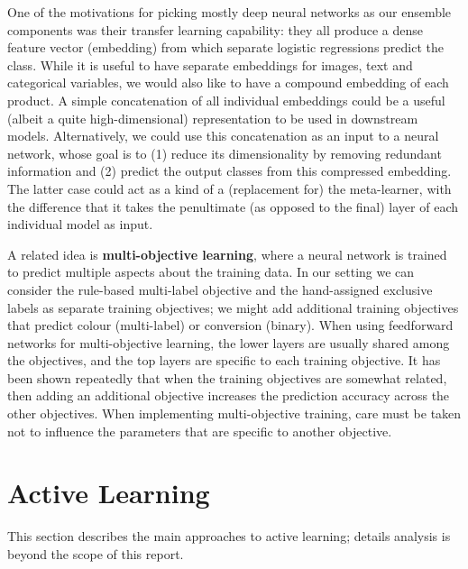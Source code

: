 One of the motivations for picking mostly deep neural networks as our ensemble components was their transfer learning capability: they all produce a dense feature vector (embedding) from which separate logistic regressions predict the class.
While it is useful to have separate embeddings for images, text and categorical variables, we would also like to have a compound embedding of each product.
A simple concatenation of all individual embeddings could be a useful (albeit a quite high-dimensional) representation to be used in downstream models.
Alternatively, we could use this concatenation as an input to a neural network, whose goal is to (1) reduce its dimensionality by removing redundant information and (2) predict the output classes from this compressed embedding.
The latter case could act as a kind of a (replacement for) the meta-learner, with the difference that it takes the penultimate (as opposed to the final) layer of each individual model as input.

A related idea is \textbf{multi-objective learning}, where a neural network is trained to predict multiple aspects about the training data.
In our setting we can consider the rule-based multi-label objective and the hand-assigned exclusive labels as separate training objectives; we might add additional training objectives that predict colour (multi-label) or conversion (binary).
When using feedforward networks for multi-objective learning, the lower layers are usually shared among the objectives, and the top layers are specific to each training objective.
It has been shown repeatedly that when the training objectives are somewhat related, then adding an additional objective increases the prediction accuracy across the other objectives.
When implementing multi-objective training, care must be taken not to influence the parameters that are specific to another objective.



\section{Active Learning}
\label{bg_al}

This section describes the main approaches to active learning;  details analysis is beyond the scope of this report.


